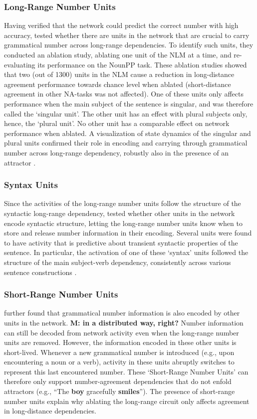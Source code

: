\subsubsection{Long-Range Number Units}
Having verified that the network could predict the correct number with high accuracy, \citet{lakretz2019emergence} tested whether there are units in the network that are crucial to carry grammatical number across long-range dependencies.  
To identify such units, they conducted an ablation study, ablating one unit of the NLM at a time, and re-evaluating its performance on the NounPP task. 
These ablation studies showed that two (out of 1300) units in the NLM cause a reduction in long-distance agreement performance towards chance level when ablated (short-distance agreement in other NA-tasks was not affected). 
One of these units only affects performance when the main subject of the sentence is singular, and was therefore called the `singular unit'. 
The other unit has an effect with plural subjects only, hence, the `plural unit'. 
No other unit has a comparable effect on network performance when ablated. 
A visualization of state dynamics of the singular and plural units confirmed their role in encoding and carrying through grammatical number across long-range dependency, robustly also in the presence of an attractor \citep[Figure 1 in][]{lakretz2019emergence}.

\subsubsection{Syntax Units}
Since the activities of the long-range number units follow the structure of the syntactic long-range dependency, \citet{lakretz2019emergence} tested whether other units in the network encode syntactic structure, letting the long-range number units know when to store and release number information in their encoding. Several units were found to have activity that is predictive about transient syntactic properties of the sentence. In particular, the activation of one of these `syntax' units followed the structure of the main subject-verb dependency, consistently across various sentence constructions \citep[Figure 3 in][]{lakretz2019emergence}.

\subsubsection{Short-Range Number Units}
\citet{lakretz2019emergence} further found that grammatical number information is also encoded by other units in the network. \textbf{M: in a distributed way, right?}
Number information can still be decoded from network activity even when the long-range number units are removed. 
However, the information encoded in these other units is short-lived. Whenever a new grammatical number  is
introduced (e.g., upon encountering a noun or a verb), activity in
these units abruptly switches to represent this last encountered
number. These `Short-Range Number Units' can therefore only support number-agreement dependencies that do not
enfold attractors (e.g., ``The \textbf{boy} gracefully
\textbf{smiles}''). The presence of short-range number units explain why ablating the long-range circuit only affects agreement in long-distance dependencies.

